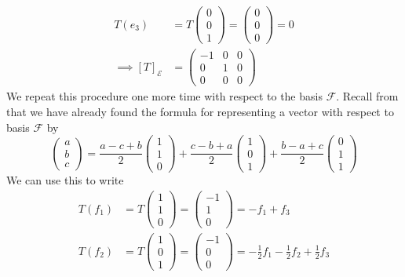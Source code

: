 \begin{exm}
\begin{align*}
		T(e_3)          & =T\begin{pmatrix}0\\0\\1\end{pmatrix}=\begin{pmatrix}0\\0\\0\end{pmatrix}=0  \\
		\implies
		[T]_\mathcal{E} & =\begin{pmatrix}
			-1 & 0 & 0 \\
			0  & 1 & 0 \\
			0  & 0 & 0
		\end{pmatrix}
	\end{align*}
	We repeat this procedure one more time with respect to the basis $\mathcal{F}$.
	Recall from  that we have already found the
	formula for representing a vector with respect to basis $\mathcal{F}$ by
	\begin{equation*}
		\begin{pmatrix}
			a \\b\\c
		\end{pmatrix}=
		\frac{a-c+b}{2}\begin{pmatrix}
			1 \\1\\0
		\end{pmatrix}+
		\frac{c-b+a}{2}\begin{pmatrix}
			1 \\0\\1
		\end{pmatrix}+
		\frac{b-a+c}{2}\begin{pmatrix}
			0 \\1\\1
		\end{pmatrix}
	\end{equation*}
	We can use this to write
	\begin{align*}
		T(f_1)          & =T\begin{pmatrix}1\\1\\0\end{pmatrix}=\begin{pmatrix}-1\\1\\0\end{pmatrix}=-f_1+f_3                                      \\
		T(f_2)          & =T\begin{pmatrix}1\\0\\1\end{pmatrix}=\begin{pmatrix}-1\\0\\0\end{pmatrix}=-\frac{1}{2}f_1-\frac{1}{2}f_2+\frac{1}{2}f_3 \\

\end{align*}
\end{exm}
